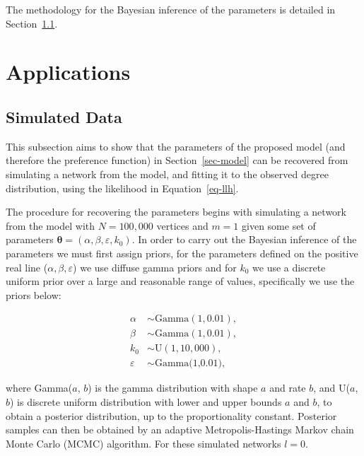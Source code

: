\documentclass[
  sn-basic,
  10pt,
]{sn-jnl}
\theoremstyle{thmstyleone}
\theoremstyle{thmstyleone}
\theoremstyle{remark}
\theoremstyle{plain}
\theoremstyle{plain}
\theoremstyle{remark}
\begin{document}
The methodology for the Bayesian inference of the parameters is detailed
in Section~\ref{sec-sim}.

\section{Applications}\label{applications}

\subsection{Simulated Data}\label{sec-sim}

This subsection aims to show that the parameters of the proposed model
(and therefore the preference function) in Section~\ref{sec-model} can
be recovered from simulating a network from the model, and fitting it to
the observed degree distribution, using the likelihood in
Equation~\ref{eq-llh}.

The procedure for recovering the parameters begins with simulating a
network from the model with \(N=100,000\) vertices and \(m=1\) given
some set of parameters
\(\pmb\theta = (\alpha, \beta, \varepsilon, k_0)\). In order to carry
out the Bayesian inference of the parameters we must first assign
priors, for the parameters defined on the positive real line
(\(\alpha, \beta,\varepsilon\)) we use diffuse gamma priors and for
\(k_0\) we use a discrete uniform prior over a large and reasonable
range of values, specifically we use the priors below:

\begin{align*}
\alpha&\sim \text{Gamma}(1,0.01),\\
\beta &\sim  \text{Gamma}(1,0.01),\\
k_0 &\sim \text{U}(1,10,000),\\
\varepsilon &\sim \text{Gamma(1,0.01)},
\end{align*}

where Gamma(\(a\), \(b\)) is the gamma distribution with shape \(a\) and
rate \(b\), and U(\(a\), \(b\)) is discrete uniform distribution with
lower and upper bounds \(a\) and \(b\), to obtain a posterior
distribution, up to the proportionality constant. Posterior samples can
then be obtained by an adaptive Metropolis-Hastings Markov chain Monte
Carlo (MCMC) algorithm. For these simulated networks \(l=0\).
\end{document}
